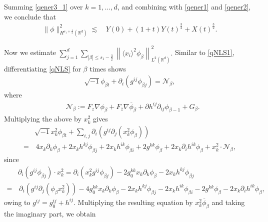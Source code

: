 \documentclass[10pt,twoside,a4paper]{article}
\numberwithin{equation}{section}\allowdisplaybreaks
\def\leq{\leqslant}
\begin{document}
Summing \eqref{qener3_1} over $ k=1,\dots,  d $,  and combining with \eqref{qener1} and \eqref{qener2}, we conclude that
\begin{align}  \label{qener3}
		\| \phi\|_{H^{ s_1+\frac12 }(\mathbb{R}^d)}^2\lesssim &\,  Y(0)+	 (1+t) Y(t)^{\frac 32} +  X(t)^{\frac 32}.
\end{align}


Now we estimate $ \sum_{j=1}^d\sum_{|\beta| \leq s_1-\frac 32} \left\| \langle x_i\rangle^2 \phi_{\beta}\right\|_{L^2(\mathbb{R}^d)}^2  .$  Similar to  \eqref{qNLS1},  differentiating  \eqref{qNLS} for $ \beta $ times shows
\begin{align}  \label{qNLSb}
	\sqrt{-1}\phi_{\beta t}+\partial_i\left( g^{ij} \phi_{\beta j}\right)=\mathcal{N}_\beta,
\end{align}
where
\begin{align*}
	&\mathcal{N}_\beta:=F_z\nabla \phi_\beta+F_{\overline{z}}\nabla \overline{\phi}_\beta+\partial h^{ij}\partial_{ij } \phi_{\beta -1}+G_\beta.
\end{align*}
Multiplying the above by $ x_k^2 $ gives
\begin{align}   \label{qNLSx2}
	&	\sqrt{-1}x_k^2\phi_{\beta t}+\sum_{i,j}\partial_i\left( g^{ij}   \partial_j \left(x_k^2 \phi_{\beta }\right)\right)\\
	=&\,4 x_k \partial_k  \phi_\beta +2 x_k h^{kj} \phi_{\beta j}+2 x_k h^{ik} \phi_{\beta i}+2 g^{kk} \phi_{\beta } +2 x_k \partial_i h^{ik} \phi_{\beta } +x^2_k \cdot\mathcal{N}_\beta,\nonumber
\end{align}
since
\begin{align*}
	&	\partial_i\left( g^{ij} \phi_{\beta j}\right) \cdot x^2_k= \partial_i\left(  x^2_k g^{ij} \phi_{\beta j}\right)  -2 g^{kk}_0x_k \partial_k  \phi_\beta -2 x_k h^{kj} \phi_{\beta j}\\ 
	=&\,\partial_i\left( g^{ij} \partial_j\left(\phi_{\beta }x^2_k\right)\right)   -4 g^{kk}_0x_k \partial_k  \phi_\beta -2 x_k h^{kj} \phi_{\beta j}-2 x_k h^{ik} \phi_{\beta i}-2 g^{kk} \phi_{\beta } -2 x_k \partial_i h^{ik} \phi_{\beta }, 
\end{align*}
owing to $ g^{ij}=g^{ij}_0+h^{ij} $. 
Multiplying the resulting equation by $ x_k^2 \overline{\phi}_\beta $ and taking the imaginary part, we obtain
\end{document}
